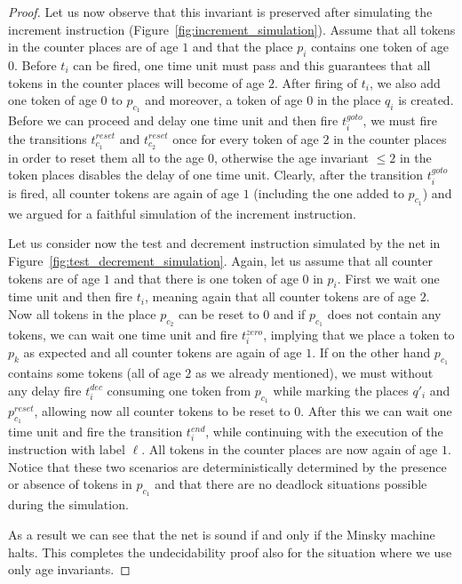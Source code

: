 \begin{proof}
Let us now observe
that this invariant is preserved after simulating the 
increment instruction (Figure~\ref{fig:increment_simulation}).
Assume that all tokens in the counter places are of age $1$ and that
the place $p_i$ contains one token of age $0$.
Before $t_i$ can be fired, one time unit must pass and this guarantees
that all tokens in the counter places will become of age $2$. After firing
of $t_i$, we also add one token of age $0$ to $p_{c_1}$ 
and moreover, a token of age $0$ in the place $q_i$ is created.
Before we can proceed and delay one time unit 
and then fire $t_i^{\mathit goto}$, we must fire the
transitions $t_{c_1}^{\mathit reset}$ and $t_{c_2}^{\mathit reset}$ once
for every token of age $2$ in the counter places in order to reset 
them all to the age $0$, otherwise the age invariant $\leq 2$ in the token 
places disables the delay of one time unit. Clearly, after the transition 
$t_i^{\mathit goto}$ is fired, all counter tokens are again of age $1$
(including the one added to $p_{c_1}$) and we argued for a faithful simulation
of the increment instruction.

Let us consider now the test and decrement instruction simulated by
the net in Figure~\ref{fig:test_decrement_simulation}. Again, let us assume
that all counter tokens are of age $1$ and that there is one token
of age $0$ in $p_i$. First we wait one time unit and then fire $t_i$,
meaning again that all counter tokens are of age $2$. Now all
tokens in the place $p_{c_2}$ can be reset to $0$ and if $p_{c_1}$
does not contain any tokens, we can wait one time unit and fire
$t_i^{\mathit zero}$, implying that we place a token to $p_k$
as expected and all counter tokens are again of age $1$.
If on the other hand $p_{c_1}$ contains some tokens (all of age $2$
as we already mentioned), we must without any delay fire
$t_i^{\mathit dec}$ consuming one token from $p_{c_1}$ while marking
the places $q'_i$ and $p^{\mathit reset}_{c_1}$, allowing
now all counter tokens to be reset to $0$. After this we can wait
one time unit and fire the transition $t_i^{\mathit end}$, while
continuing with the execution of the instruction with label $\ell$.
All tokens in the counter places are now again of age $1$.
Notice that these two scenarios are deterministically determined
by the presence or absence of tokens in $p_{c_1}$ and that there are
no deadlock situations possible during the simulation.

As a result
we can see that the net is sound if and only if
the Minsky machine halts. This completes the undecidability proof
also for the situation where we use only age invariants.
\end{proof}

